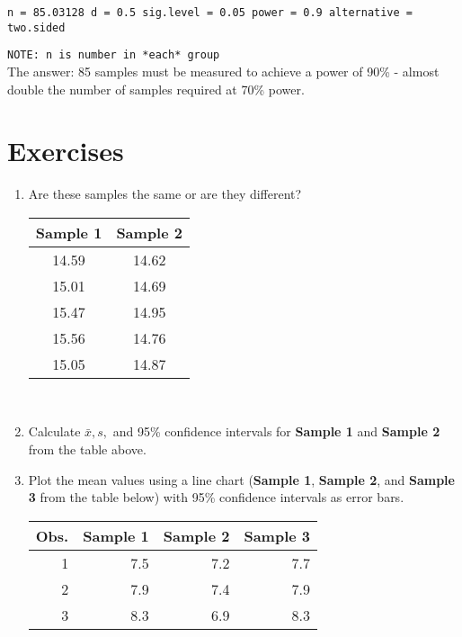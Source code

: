 \noindent\texttt{n = 85.03128
d = 0.5
sig.level = 0.05
power = 0.9
alternative = two.sided}

\noindent\texttt{NOTE: n is number in *each* group}\\


The answer: 85 samples must be measured to achieve a power of 90\% - almost double the number of samples required at 70\% power.
\newpage
\section{Exercises}

\begin{enumerate}
\item Are these samples the same or are they different?

\begin{tabular}{|c|c|}
\hline \textbf{Sample 1} & \textbf{Sample 2} \\ 
\hline 14.59 & 14.62 \\ 
\hline 15.01 & 14.69 \\ 
\hline 15.47 & 14.95 \\ 
\hline 15.56 & 14.76 \\ 
\hline 15.05 & 14.87 \\ 
\hline 

\end{tabular}\\
\item Calculate $ \bar{x}, s, $ and 95\% confidence intervals for \textbf{Sample 1} and \textbf{Sample 2} from the table above.
\item Plot the mean values using a line chart (\textbf{Sample 1}, \textbf{Sample 2}, and \textbf{Sample 3} from the table below) with 95\% confidence intervals as error bars.

\begin{tabular}{|r|r|r|r|}
\hline Obs. & \textbf{Sample 1} & \textbf{Sample 2} & \textbf{Sample 3} \\ 
\hline 1 & 7.5 & 7.2 & 7.7 \\ 
\hline 2 & 7.9 & 7.4 & 7.9 \\ 
\hline 3 & 8.3 & 6.9 & 8.3 \\ 
\hline 
\end{tabular} 

\end{enumerate}
